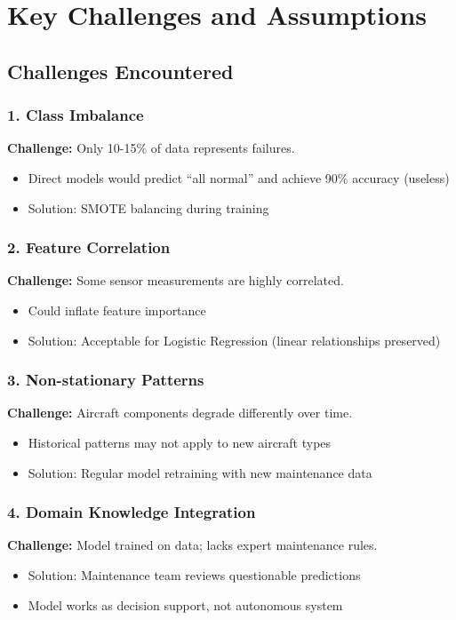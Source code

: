 \documentclass[11pt,a4paper]{article}
\begin{document}
\section{Key Challenges and Assumptions}

\subsection{Challenges Encountered}

\subsubsection{1. Class Imbalance}
\textbf{Challenge:} Only 10-15\% of data represents failures.
\begin{itemize}
    \item Direct models would predict ``all normal'' and achieve 90\% accuracy (useless)
    \item Solution: SMOTE balancing during training
\end{itemize}

\subsubsection{2. Feature Correlation}
\textbf{Challenge:} Some sensor measurements are highly correlated.
\begin{itemize}
    \item Could inflate feature importance
    \item Solution: Acceptable for Logistic Regression (linear relationships preserved)
\end{itemize}

\subsubsection{3. Non-stationary Patterns}
\textbf{Challenge:} Aircraft components degrade differently over time.
\begin{itemize}
    \item Historical patterns may not apply to new aircraft types
    \item Solution: Regular model retraining with new maintenance data
\end{itemize}

\subsubsection{4. Domain Knowledge Integration}
\textbf{Challenge:} Model trained on data; lacks expert maintenance rules.
\begin{itemize}
    \item Solution: Maintenance team reviews questionable predictions
    \item Model works as decision support, not autonomous system
\end{itemize}
\end{document}
